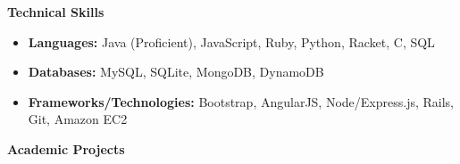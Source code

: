 \documentclass[letterpaper,11pt]{article}
\newcommand{\resheading}[1]{{\large \colorbox{mygrey}{\begin{minipage}{\textwidth}{\textbf{#1 \vphantom{p\^{E}}}}\end{minipage}}}}
\begin{document}

    \resheading{Technical Skills}

    \begin{itemize}
        \item {
        \textbf{Languages:}
        \vspace{-0.2cm}
        Java (Proficient), JavaScript, Ruby, Python, Racket, C, SQL
        }
        \item {
        \textbf{Databases:}
        \vspace{-0.2cm}
        MySQL, SQLite, MongoDB, DynamoDB
        }
        \item {
        \textbf{Frameworks/Technologies:}
        Bootstrap, AngularJS, Node/Express.js, Rails, Git, Amazon EC2
        }
    \end{itemize}


    \resheading{Academic Projects}
\end{document}
